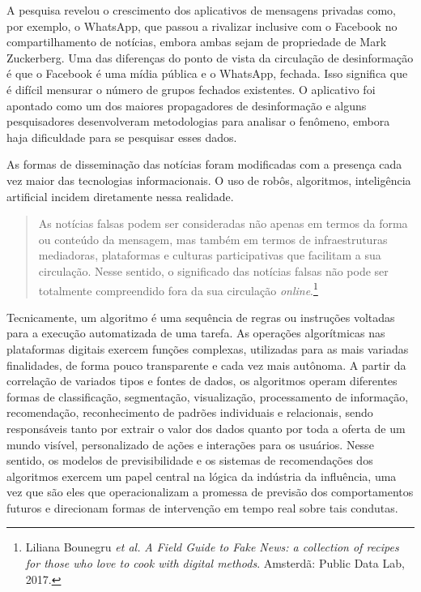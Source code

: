 A pesquisa revelou o crescimento dos aplicativos de mensagens privadas
como, por exemplo, o WhatsApp, que passou a rivalizar inclusive com o
Facebook no compartilhamento de notícias, embora ambas sejam de
propriedade de Mark Zuckerberg. Uma das diferenças do ponto de vista da
circulação de desinformação é que o Facebook é uma mídia pública e o
WhatsApp, fechada. Isso significa que é difícil mensurar o número de
grupos fechados existentes. O aplicativo foi apontado como um dos
maiores propagadores de desinformação e alguns pesquisadores
desenvolveram metodologias para analisar o fenômeno, embora haja
dificuldade para se pesquisar esses dados.

As formas de disseminação das notícias foram modificadas com a presença
cada vez maior das tecnologias informacionais. O uso de robôs,
algoritmos, inteligência artificial incidem diretamente nessa realidade.

\begin{quote}
As notícias falsas podem ser consideradas não apenas em termos da forma
ou conteúdo da mensagem, mas também em termos de infraestruturas
mediadoras, plataformas e culturas participativas que facilitam a sua
circulação. Nesse sentido, o significado das notícias falsas não pode
ser totalmente compreendido fora da sua circulação \textit{online}.\footnote{Liliana Bounegru \textit{et al.} \textit{A Field Guide to Fake News: a collection of recipes for those who love to cook with digital methods}. Amsterdã: Public Data Lab, 2017.}
\end{quote}

Tecnicamente, um algoritmo é uma sequência de regras ou instruções
voltadas para a execução automatizada de uma tarefa. As operações
algorítmicas nas plataformas digitais exercem funções complexas,
utilizadas para as mais variadas finalidades, de forma pouco
transparente e cada vez mais autônoma. A partir da correlação de
variados tipos e fontes de dados, os algoritmos operam diferentes formas
de classificação, segmentação, visualização, processamento de
informação, recomendação, reconhecimento de padrões individuais e
relacionais, sendo responsáveis tanto por extrair o valor dos dados
quanto por toda a oferta de um mundo visível, personalizado de ações e
interações para os usuários. Nesse sentido, os modelos de
previsibilidade e os sistemas de recomendações dos algoritmos exercem um
papel central na lógica da indústria da influência, uma vez que são eles
que operacionalizam a promessa de previsão dos comportamentos futuros e
direcionam formas de intervenção em tempo real sobre tais condutas.

